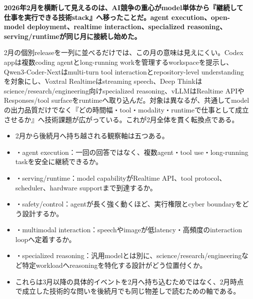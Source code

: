 \noindent\textbf{2026年2月を横断して見えるのは、AI競争の重心がmodel単体から『継続して仕事を実行できる技術stack』へ移ったことだ。agent execution、open-model deployment、realtime interaction、specialized reasoning、serving/runtimeが同じ月に接続し始めた。}\autocite{src-15823ae5556e,src-5041feb6f87f,src-d8b7c1c36830,src-dd5d9b8662f3,src-eac8dfbeb78c}

2月の個別releaseを一列に並べるだけでは、この月の意味は見えにくい。Codex appは複数coding agentとlong-running workを管理するworkspaceを提示し、Qwen3-Coder-Nextはmulti-turn tool interactionとrepository-level understandingを対象にし、Voxtral Realtimeはstreaming speech、Deep Thinkはscience/research/engineering向けspecialized reasoning、vLLMはRealtime APIやResponses/tool surfaceをruntimeへ取り込んだ。対象は異なるが、共通してmodelの出力品質だけでなく『どの時間幅・tool・modality・runtimeで仕事として成立させるか』へ技術課題が広がっている。これが2月全体を貫く転換点である。\autocite{src-15823ae5556e,src-5041feb6f87f,src-d8b7c1c36830,src-dd5d9b8662f3,src-eac8dfbeb78c}


\begin{itemize}
  \item 2月から後続月へ持ち越される観察軸は五つある。
  \item ・agent execution：一回の回答ではなく、複数agent・tool use・long-running taskを安全に継続できるか。
  \item ・serving/runtime：model capabilityがRealtime API、tool protocol、scheduler、hardware supportまで到達するか。
  \item ・safety/control：agentが長く強く動くほど、実行権限とcyber boundaryをどう設計するか。
  \item ・multimodal interaction：speechやimageが低latency・高頻度のinteraction loopへ定着するか。
  \item ・specialized reasoning：汎用modelとは別に、science/research/engineeringなど特定workloadへreasoningを特化する設計がどう位置付くか。
  \item これらは3月以降の具体的イベントを2月へ持ち込むためではなく、2月時点で成立した技術的な問いを後続月でも同じ物差しで読むための軸である。
\end{itemize}
\autocite{src-15823ae5556e,src-4a841ea7ec7c,src-5041feb6f87f,src-9aba7995b6a5,src-d8b7c1c36830,src-dd5d9b8662f3,src-dd64fe3084a4}

